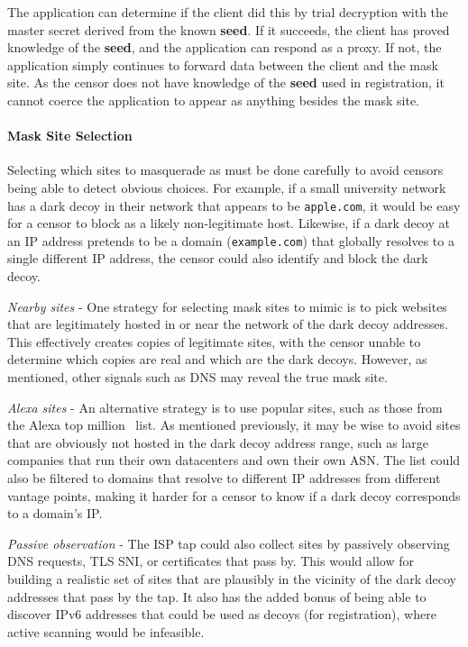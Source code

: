 \documentclass[letterpaper,twocolumn,10pt]{article}
\begin{document}
The application can determine if the client did this by trial decryption with
the master secret derived from the known \textbf{seed}. If it succeeds, the
client has proved knowledge of the \textbf{seed}, and the application can
respond as a proxy. If not, the application simply continues to forward data
between the client and the mask site. As the censor does not have knowledge of
the \textbf{seed} used in registration, it cannot coerce the application to
appear as anything besides the mask site.


\paragraph{Mask Site Selection}

Selecting which sites to masquerade as must be done carefully to avoid censors
being able to detect obvious choices. For example, if a small university network
has a dark decoy in their network that appears to be \texttt{apple.com}, it
would be easy for a censor to block as a likely non-legitimate host. Likewise,
if a dark decoy at an IP address pretends to be a domain (\texttt{example.com}) that
globally resolves to a single different IP address, the censor could also
identify and block the dark decoy.

\smallskip
\noindent
\emph{Nearby sites} - One strategy for selecting mask sites to mimic is to pick websites that are
legitimately hosted in or near the network of the dark decoy addresses. This
effectively creates copies of legitimate sites, with the censor unable to
determine which copies are real and which are the dark decoys. However, as
mentioned, other signals such as DNS may reveal the true mask site.

\smallskip
\noindent
\emph{Alexa sites} -
An alternative strategy is to use popular sites, such as those from the Alexa
top million~\cite{alexa} list. As mentioned previously, it may be wise to avoid
sites that are obviously not hosted in the dark decoy address range, such as
large companies that run their own datacenters and own their own ASN.
The list could also be filtered to domains that resolve to different IP
addresses from different vantage points, making it harder for a censor to know
if a dark decoy corresponds to a domain's IP.

\smallskip
\noindent
\emph{Passive observation} -
The ISP tap could also collect sites by passively observing DNS requests, TLS
SNI, or certificates that pass by. This would allow for building a realistic set
of sites that are plausibly in the vicinity of the dark decoy addresses
that pass by the tap. It also has the added bonus of being able to discover
IPv6 addresses that could be used as decoys (for registration), where active
scanning would be infeasible.
\end{document}
